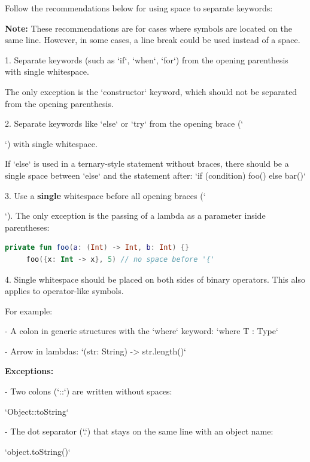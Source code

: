 {{\label{sec:3.8.1}



Follow the recommendations below for using space to separate keywords:



\textbf{Note:} These recommendations are for cases where symbols are located on the same line. However, in some cases, a line break could be used instead of a space.



1.  Separate keywords (such as `if`, `when`, `for`) from the opening parenthesis with single whitespace.

    The only exception is the `constructor` keyword, which should not be separated from the opening parenthesis.



2.  Separate keywords like `else` or `try` from the opening brace (`{`) with single whitespace.

    If `else` is used in a ternary-style statement without braces, there should be a single space between `else` and the statement after: `if (condition) foo() else bar()`



3.  Use a \textbf{single} whitespace before all opening braces (`{`). The only exception is the passing of a lambda as a parameter inside parentheses:

\begin{lstlisting}[language=Kotlin]
     private fun foo(a: (Int) -> Int, b: Int) {}
     foo({x: Int -> x}, 5) // no space before '{'
\end{lstlisting}


4.  Single whitespace should be placed on both sides of binary operators. This also applies to operator-like symbols.

    For example: 

    

 - A colon in generic structures with the `where` keyword:  `where T : Type`

 - Arrow in lambdas: `(str: String) -> str.length()`



\textbf{Exceptions:}



- Two colons (`::`) are written without spaces:\

  `Object::toString`

- The dot separator (`.`) that stays on the same line with an object name:\

  `object.toString()`

}}}}
